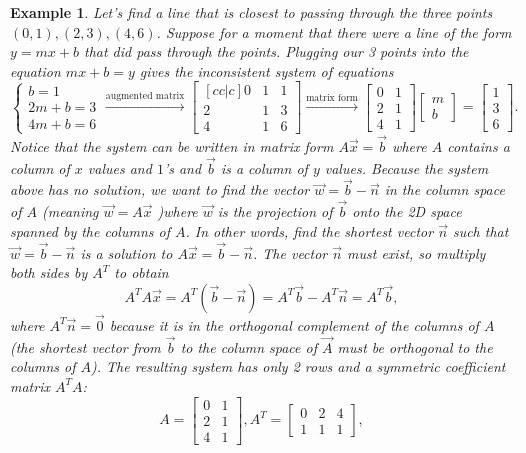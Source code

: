 \documentclass[10pt]{article}
\theoremstyle{plain}
\theoremstyle{box}
\newtheorem{example}{Example}
\begin{document}
\begin{example}
Let's find a line that is closest to passing through the three points $(0,1),(2,3),(4,6)$. Suppose for a moment that there were a line of the form $y=mx+b$ that did pass through the points.  Plugging our 3 points into the equation $mx+b=y$ gives the inconsistent system of equations 
$$\begin{cases}b=1\\2m+b=3\\4m+b=6\end{cases}
\xrightarrow{\text{augmented matrix}}
\begin{bmatrix}[cc|c]0&1&1\\2&1&3\\4&1&6\end{bmatrix}
\xrightarrow{\text{matrix form}}
\begin{bmatrix}0&1\\2&1\\4&1\end{bmatrix}
\begin{bmatrix}m\\b\end{bmatrix}
=\begin{bmatrix}1\\3\\6\end{bmatrix}.
$$
Notice that the system can be written in matrix form $A\vec x = \vec b$ where $A$ contains a column of $x$ values and $1$'s and $\vec b$ is a column of $y$ values.  Because the system above has no solution, we want to find the vector $\vec w = \vec b-\vec n$ in the column space of $A$ (meaning $\vec w=A\vec x$ )where $\vec w$ is the projection of $\vec b$ onto the 2D space spanned by the columns of $A$. In other words, find the shortest vector $\vec n$ such that $\vec w= \vec b-\vec n$ is a solution to $A\vec x = \vec b-\vec n$. The vector $\vec n$ must exist, so multiply both sides by $A^T$ to obtain
$$A^T A \vec x = A^T(\vec b-\vec n) =A^T\vec b - A^T\vec n = A^T\vec b,$$
where $A^T\vec n = \vec 0$ because it is in the orthogonal complement of the columns of $A$ (the shortest vector from $\vec b$ to the column space of $\vec A$ must be orthogonal to the columns of $A$). 
The resulting system has only 2 rows and a symmetric coefficient matrix $A^TA$:
$$A = \begin{bmatrix}0&1\\2&1\\4&1\end{bmatrix}, 
A^T = \begin{bmatrix}0&2&4\\1&1&1\end{bmatrix}, 
$$
\end{example}
\end{document}
